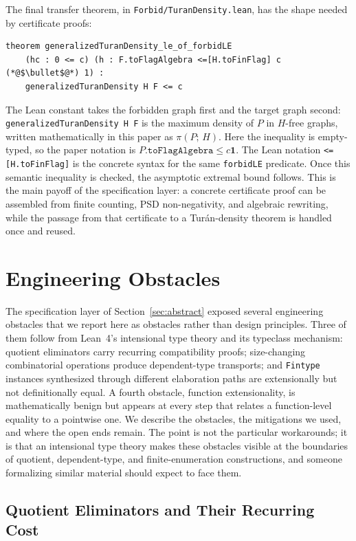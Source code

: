 \documentclass{article}
\newcommand{\tdensity}[2]{\pi(#1;\,#2)}
\newcommand{\lean}[1]{\texttt{#1}}
\begin{document}
The final transfer theorem, in \lean{Forbid/TuranDensity.lean}, has the shape
needed by certificate proofs:
\begin{lstlisting}
theorem generalizedTuranDensity_le_of_forbidLE
    (hc : 0 <= c) (h : F.toFlagAlgebra <=[H.toFinFlag] c (*@$\bullet$@*) 1) :
    generalizedTuranDensity H F <= c
\end{lstlisting}
The Lean constant takes the forbidden graph first and the target graph
second: \lean{generalizedTuranDensity H F} is the maximum density of $P$ in
$H$-free graphs, written mathematically in this paper as $\tdensity{P}{H}$.
Here the inequality is empty-typed, so the paper notation is
$P.\lean{toFlagAlgebra} \leq c\mathbf{1}$.
The Lean notation \lean{<=[H.toFinFlag]} is the concrete syntax for the same
\lean{forbidLE} predicate.  Once this semantic inequality is checked, the
asymptotic extremal bound follows.  This is the main payoff of the
specification layer: a concrete certificate proof can be assembled from finite
counting, PSD non-negativity, and algebraic rewriting, while the passage from
that certificate to a Tur\'an-density theorem is handled once and reused.


\section{Engineering Obstacles}
\label{sec:obstacles}

The specification layer of Section~\ref{sec:abstract} exposed several
engineering obstacles that we report here as obstacles rather than design
principles.  Three of them follow from Lean~4's intensional type theory and
its typeclass mechanism: quotient eliminators carry recurring compatibility
proofs; size-changing combinatorial operations produce dependent-type
transports; and \lean{Fintype} instances synthesized through different
elaboration paths are extensionally but not definitionally equal.  A fourth
obstacle, function extensionality, is mathematically benign but appears at
every step that relates a function-level equality to a pointwise one.  We
describe the obstacles, the mitigations we used, and where the open ends
remain.  The point is not the particular workarounds; it is that an
intensional type theory makes these obstacles visible at the boundaries of
quotient, dependent-type, and finite-enumeration constructions, and someone
formalizing similar material should expect to face them.

\subsection{Quotient Eliminators and Their Recurring Cost}
\end{document}
